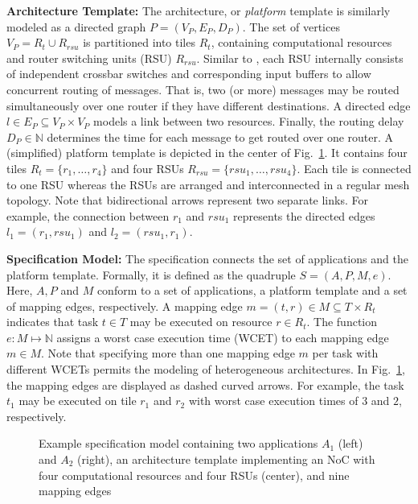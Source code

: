 \vspace*{.5mm}
\textbf{Architecture Template: }
The architecture, or \emph{platform} template is similarly modeled as a directed graph $P=(V_P,E_P,D_P)$. 
The set of \mbox{vertices} $V_P=R_{t}\cup R_{rsu} $ is partitioned into tiles $R_{t}$, containing computational resources and router switching units (RSU) $R_{rsu}$. 
Similar to \cite{Biewer2015}, each RSU internally consists of independent crossbar switches and corresponding input buffers to allow concurrent routing of messages. 
That is, two (or more) messages may be routed simultaneously over one router if they have different destinations. 
A directed edge $l\in E_P\subseteq V_P\times V_P$ models a link between two resources. 
Finally, the routing delay $D_P\in\mathbb{N}$ determines the time for each message to get routed over one router. 
A (simplified) platform template is depicted in the center of Fig.~\ref{fig:specmodel}. 
It contains four tiles $R_t=\{r_1,\ldots,r_4\}$ and four RSUs $R_{rsu}=\{rsu_1,\ldots,rsu_4\}$. 
Each tile is connected to one RSU whereas the RSUs are arranged and interconnected in a regular mesh topology. 
Note that bidirectional arrows represent two separate links. 
For example, the connection between $r_1$ and $rsu_1$ represents the directed edges $l_1=(r_1,rsu_1)$ and $l_2=(rsu_1,r_1)$.

\vspace*{.5mm}
\textbf{Specification Model: }
The specification connects the set of applications and the platform template. 
Formally, it is defined as the quadruple $S=(A,P,M,e)$. Here, $A,P$ and $M$ conform to a set of applications, a platform template and a set of mapping edges, respectively. 
A mapping edge $m=(t,r)\in M\subseteq T\times R_t$ indicates that task $t\in T$ may be executed on resource $r\in R_t$. 
The function $e:M\mapsto\mathbb{N}$ assigns a worst case execution time (WCET) to each mapping edge $m\in M$. 
Note that specifying more than one mapping edge $m$ per task with different WCETs permits the modeling of heterogeneous architectures.
In Fig.~\ref{fig:specmodel}, the mapping edges are displayed as dashed curved arrows. 
For example, the task $t_1$ may be executed on tile $r_1$ and $r_2$ with worst case execution times of $3$ and $2$, respectively.
\begin{figure}[tb]
	\centering
		
	\vspace*{-8mm}
	\caption{Example specification model containing two applications $A_1$ (left) and $A_2$ (right), an architecture template implementing an NoC with four computational resources and four RSUs (center), and nine mapping edges}
	\label{fig:specmodel}
	\vspace*{-6mm}
\end{figure}
